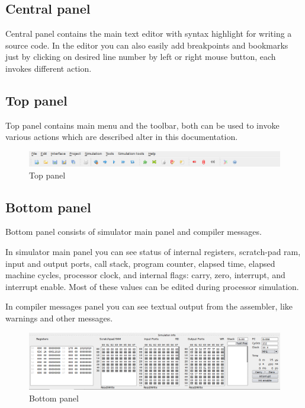     \clearpage
    \subsection{Central panel}
        Central panel contains the main text editor with syntax highlight for writing a source code. In the editor you can also easily add breakpoints and bookmarks just by clicking on desired line number by left or right mouse button, each invokes different action.

    \subsection{Top panel}
        Top panel contains main menu and the toolbar, both can be used to invoke various actions which are described alter in this documentation.

        \begin{figure}[h!]
            \centering
            \includegraphics[width=.9\textwidth]{img/top_panel.png}
            \caption{Top panel}
        \end{figure}

    \subsection{Bottom panel}
        Bottom panel consists of simulator main panel and compiler messages.

        In simulator main panel you can see status of internal registers, scratch-pad ram, input and output ports, call
        stack, program counter, elapsed time, elapsed machine cycles, processor clock, and internal flags: carry, zero, interrupt, and interrupt enable. Most of these values can be edited during processor simulation.

        In compiler messages panel you can see textual output from the assembler, like warnings and other messages.

        \begin{figure}[h!]
            \centering
            \includegraphics[width=.9\textwidth]{img/bottom_panel.png}
            \caption{Bottom panel}
        \end{figure}

